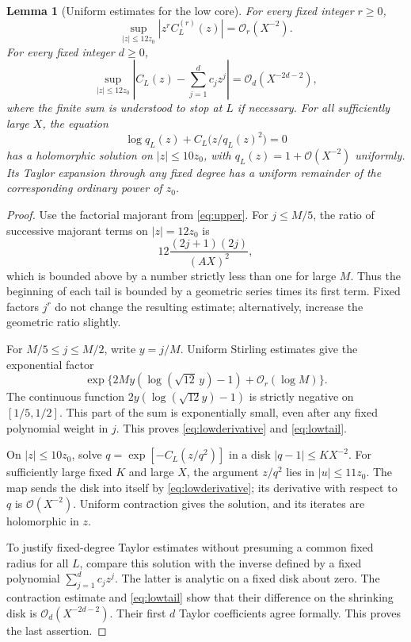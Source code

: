 \documentclass[11pt,a4paper]{article}
\newtheorem{lemma}[theorem]{Lemma}
\theoremstyle{definition}
\numberwithin{equation}{section}
\newcommand{\Oh}{\mathcal O}
\begin{document}
\begin{lemma}[Uniform estimates for the low core]
\label{lem:low}
For every fixed integer $r\ge0$,
\begin{equation}
 \sup_{|z|\le12z_0}\left|z^rC_L^{(r)}(z)\right|=\Oh_r(X^{-2}).
 \label{eq:lowderivative}
\end{equation}
For every fixed integer $d\ge0$,
\begin{equation}
 \sup_{|z|\le12z_0}
 \left|C_L(z)-\sum_{j=1}^dc_jz^j\right|
 =\Oh_d(X^{-2d-2}),
 \label{eq:lowtail}
\end{equation}
where the finite sum is understood to stop at $L$ if necessary. For all sufficiently large $X$, the equation
\begin{equation}
 \log q_L(z)+C_L\bigl(z/q_L(z)^2\bigr)=0
 \label{eq:lowinverse}
\end{equation}
has a holomorphic solution on $|z|\le10z_0$, with
$q_L(z)=1+\Oh(X^{-2})$ uniformly. Its Taylor expansion through any fixed degree has a uniform remainder of the corresponding ordinary power of $z_0$.
\end{lemma}
\begin{proof}
Use the factorial majorant from \eqref{eq:upper}. For $j\le M/5$, the ratio of successive majorant terms on $|z|=12z_0$ is
\[
 12\frac{(2j+1)(2j)}{(AX)^2},
\]
which is bounded above by a number strictly less than one for large $M$. Thus the beginning of each tail is bounded by a geometric series times its first term. Fixed factors $j^r$ do not change the resulting estimate; alternatively, increase the geometric ratio slightly.

For $M/5\le j\le M/2$, write $y=j/M$. Uniform Stirling estimates give the exponential factor
\[
 \exp\{2My(\log(\sqrt{12}\,y)-1)+\Oh_r(\log M)\}.
\]
The continuous function $2y(\log(\sqrt{12}y)-1)$ is strictly negative on $[1/5,1/2]$. This part of the sum is exponentially small, even after any fixed polynomial weight in $j$. This proves \eqref{eq:lowderivative} and \eqref{eq:lowtail}.

On $|z|\le10z_0$, solve
$q=\exp[-C_L(z/q^2)]$ in a disk $|q-1|\le KX^{-2}$. For sufficiently large fixed $K$ and large $X$, the argument $z/q^2$ lies in $|u|\le11z_0$. The map sends the disk into itself by \eqref{eq:lowderivative}; its derivative with respect to $q$ is $\Oh(X^{-2})$. Uniform contraction gives the solution, and its iterates are holomorphic in $z$.

To justify fixed-degree Taylor estimates without presuming a common fixed radius for all $L$, compare this solution with the inverse defined by a fixed polynomial $\sum_{j=1}^dc_jz^j$. The latter is analytic on a fixed disk about zero. The contraction estimate and \eqref{eq:lowtail} show that their difference on the shrinking disk is $\Oh_d(X^{-2d-2})$. Their first $d$ Taylor coefficients agree formally. This proves the last assertion.
\end{proof}
\end{document}
